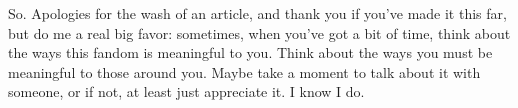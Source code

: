 So. Apologies for the wash of an article, and thank you if you've made
it this far, but do me a real big favor: sometimes, when you've got a
bit of time, think about the ways this fandom is meaningful to you.
Think about the ways you must be meaningful to those around you. Maybe
take a moment to talk about it with someone, or if not, at least just
appreciate it. I know I do.
